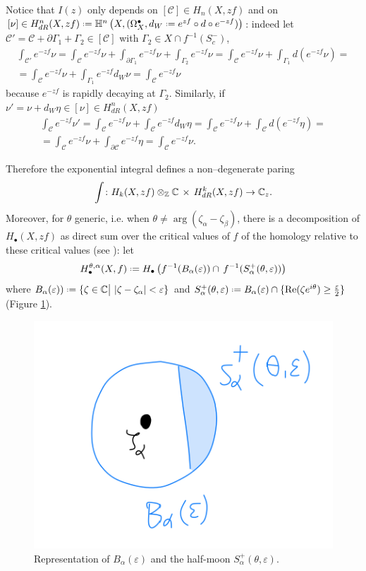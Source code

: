 \documentclass[11pt,a4paper,twoside,leqno,noamsfonts]{amsart}
\numberwithin{equation}{section}
\begin{document}
\color{Aquamarine}
Notice that $I(z)$ only depends on $[\mathcal{C}]\in H_n(X,zf)$ and on $[\nu]\in H_{dR}^n(X,zf)\defeq\mathbb{H}^n\left(X,(\Omega^\bullet_X,d_W\defeq e^{zf}\circ d\circ e^{-zf})\right)$: indeed let $\mathcal{C}'=\mathcal{C}+\partial\Gamma_1+\Gamma_2\in [\mathcal{C}]$ with $\Gamma_2\in X\cap f^{-1}(S_c^-)$,
\begin{multline*}
\int_{\mathcal{C}'}e^{-zf}\nu=\int_{\mathcal{C}}e^{-zf}\nu+\int_{\partial\Gamma_1}e^{-zf}\nu+\int_{\Gamma_2}e^{-zf}\nu
=\int_{\mathcal{C}}e^{-zf}\nu+\int_{\Gamma_1}d\left(e^{-zf}\nu\right)=\\
=\int_{\mathcal{C}}e^{-zf}\nu+\int_{\Gamma_1}e^{-zf}d_W\nu=\int_{\mathcal{C}}e^{-zf}\nu
\end{multline*} 
because $e^{-zf}$ is rapidly decaying at $\Gamma_2$. Similarly, if $\nu'=\nu+d_W\eta\in [\nu]\in H_{dR}^n(X,zf)$
\begin{multline*}
\int_{\mathcal{C}}e^{-zf}\nu'=\int_{\mathcal{C}}e^{-zf}\nu+\int_{\mathcal{C}}e^{-zf}d_{W}\eta=\int_{\mathcal{C}}e^{-zf}\nu+\int_{\mathcal{C}}d(e^{-zf}\eta)=\\
=\int_{\mathcal{C}}e^{-zf}\nu+\int_{\partial\mathcal{C}}e^{-zf}\eta=\int_{\mathcal{C}}e^{-zf}\nu.
\end{multline*}

Therefore the exponential integral defines a non--degenerate  paring \[\int\colon H_k(X,zf)\otimes_\mathbb Z\mathbb C\,\times\, H^k_{dR}(X,zf)\to \mathbb C_z. \]
Moreover, for $\theta$ generic, i.e. when $\theta\neq\arg(\zeta_\alpha-\zeta_\beta)$, there is a decomposition of $H_\bullet(X,zf)$ as direct sum over the critical values of $f$ of the homology relative to these critical values (see \cite{pham}\cite{KKP}): let \[H_\bullet^{\theta,\alpha}(X,f)\defeq H_\bullet\left(f^{-1}(B_\alpha(\varepsilon))\cap \,f^{-1}(S_\alpha^+(\theta,\varepsilon))\right)\] where $B_\alpha(\varepsilon))\defeq\lbrace \zeta \in\C\big\vert\,\, |\zeta-\zeta_\alpha|<\varepsilon\rbrace$ and $S_\alpha^+(\theta,\varepsilon)\defeq B_\alpha(\varepsilon)\cap\lbrace \mathrm{Re}(\zeta e^{i\theta})\geq \tfrac{\varepsilon}{2}\rbrace$ (Figure \ref{fig:ball}).
\begin{figure}[h]
\includegraphics[scale=0.5]{Cattura}
\caption{Representation of $B_\alpha(\varepsilon)$ and the half-moon $S_\alpha^+(\theta,\varepsilon)$.}\label{fig:ball} 
\end{figure}
\end{document}
